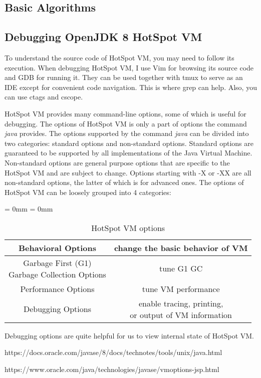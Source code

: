 \documentclass[UTF8, 12pt]{ctexart}
\begin{document}
\subsection{Basic Algorithms}


\begin{appendices}
\section{Debugging OpenJDK 8 HotSpot VM}
To understand the source code of HotSpot VM, you may need to follow its execution. When debugging HotSpot VM, I use Vim for browsing its source code and GDB for running it. They can be used together with tmux to serve as an IDE except for convenient code navigation. This is where grep can help. Also, you can use ctags and cscope.

HotSpot VM provides many command-line options, some of which is useful for debugging. The options of HotSpot VM is only a part of options the command \textit{java} provides. The options supported by the command \textit{java} can be divided into two categories: standard options and non-standard options. Standard options are guaranteed to be supported by all implementations of the Java Virtual Machine. Non-standard options are general purpose options that are specific to the HotSpot VM and are subject to change. Options starting with -X or -XX are all non-standard options, the latter of which is for advanced ones.\cite{java_command} The options of HotSpot VM can be loosely grouped into 4 categories:\cite{hotspot_options}
\begin{table}[h!]
\caption{HotSpot VM options}
\begin{center}
\aboverulesep = 0mm
\belowrulesep = 0mm
\begin{tabular}{c|c}
\toprule
\hline
Behavioral Options & change the basic behavior of VM \\ \hline
\makecell{Garbage First (G1) \\ Garbage Collection Options} & tune G1 GC\\ \hline
Performance Options & tune VM performance \\ \hline
Debugging Options & \makecell{enable tracing, printing, \\ or output of VM information} \\ \hline
\bottomrule
\hline
\end{tabular}
\end{center}
\end{table}

Debugging options are quite helpful for us to view internal state of HotSpot VM.

\end{appendices}


\newpage
\begin{thebibliography}{9}
https://docs.oracle.com/javase/8/docs/technotes/tools/unix/java.html

https://www.oracle.com/java/technologies/javase/vmoptions-jsp.html
\end{thebibliography}
\end{document}
